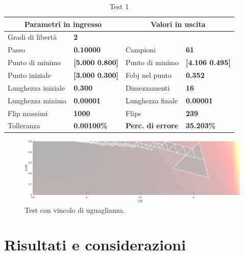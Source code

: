 \documentclass[a4paper, 11pt]{article}
\begin{document}
\begin{table}[h]
    \caption{Test 1}
    \begin{center}
    \begin{tabular}{|l|l|l|l|} 
    \hline
\multicolumn{2}{|c|}{\textbf{Parametri in ingresso}} &
\multicolumn{2}{c|}{\textbf {Valori in uscita}} \\ \hline
Gradi di libertà  & \textbf{2} &  &  \\ \hline 
Passo & \textbf{0.10000} & Campioni & \textbf{61} \\ \hline 
Punto di minimo & \textbf{{[}5.000 0.800{]}} & Punto di minimo &
\textbf{{[}4.106 0.495{]}} \\ \hline 
Punto iniziale & \textbf{{[}3.000 0.300{]}} & Fobj nel punto & \textbf{0.352} \\
\hline 
Lunghezza iniziale & \textbf{0.300} & Dimezzamenti & \textbf{16} \\ \hline 
Lunghezza minima & \textbf{0.00001} & Lunghezza finale & \textbf{0.00001} \\
\hline
Flip massimi & \textbf{1000} & Flips & \textbf{239} \\ \hline 
Tolleranza & \textbf{0.00100\%} & \textbf{Perc. di errore} & \textbf{35.203\%}
\\ \hline 
    \end{tabular} 
    \end{center}
    \end{table}

\begin{figure}[H]
    \centering
        \includegraphics[width=15cm]{assets/figure11}
        \caption{Test con vincolo di uguaglianza.}
\end{figure}

\newpage
\section*{Risultati e considerazioni}
\end{document}
